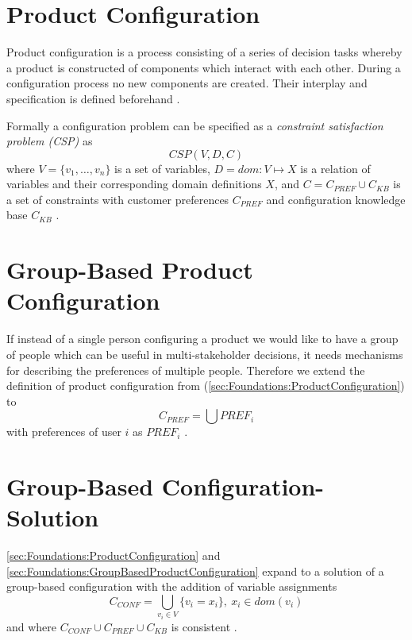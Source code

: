 \section{Product Configuration}
\label{sec:Foundations:ProductConfiguration}

Product configuration is a process consisting of a series of decision tasks whereby a product is constructed of components which interact with each other. During a configuration process no new components are created. Their interplay and specification is defined beforehand \cite[~ pp. 42, 43]{sabinProductConfigurationFrameworksa1998}.

Formally a configuration problem can be specified as a \emph{constraint satisfaction problem (CSP)} \cite{tsangFoundationsConstraintSatisfaction1993} as 
\[
    CSP(V,D,C)
\]
where \( V = \{v_1,\dots, v_n\} \) is a set of variables, \( D = dom : V \mapsto X \) is a relation of variables and their corresponding domain definitions \( X \), and \( C = C_{PREF} \cup C_{KB} \) is a set of constraints with customer preferences \( C_{PREF} \) and configuration knowledge base \( C_{KB} \) \cite{felferningGroupBasedConfiguration2016, felfernigOpenConfiguration2014}.


\section{Group-Based Product Configuration}
\label{sec:Foundations:GroupBasedProductConfiguration}

If instead of a single person configuring a product we would like to have a group of people which can be useful in multi-stakeholder decisions, it needs mechanisms for describing the preferences of multiple people. Therefore we extend the definition of product configuration from (\autoref{sec:Foundations:ProductConfiguration}) to 
\[ 
    C_{PREF} = \bigcup 
PREF_i \]
with preferences of user \( i \) as \( PREF_i \) \cite{ felferningGroupBasedConfiguration2016}.

\section{Group-Based Configuration-Solution}
\label{sec:Foundations:GroupBasedConfigurationSolution}

\autoref{sec:Foundations:ProductConfiguration} and \autoref{sec:Foundations:GroupBasedProductConfiguration} expand to a solution of a group-based configuration with the addition of variable assignments
\[
    C_{CONF} = \bigcup_{v_i \in V} \{ v_i = x_i \}, \ x_i \in dom(v_i)
\]
and where \( C_{CONF} \cup C_{PREF} \cup C_{KB} \) is consistent \cite{ felferningGroupBasedConfiguration2016}.


